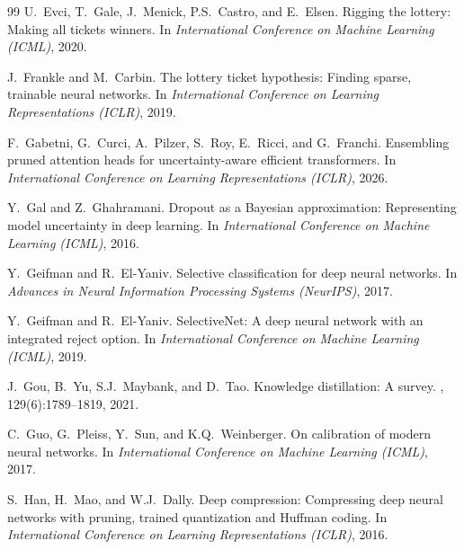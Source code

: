 \documentclass[letterpaper]{article} %
\begin{document}
\begin{thebibliography}{99}
U.~Evci, T.~Gale, J.~Menick, P.S.~Castro, and E.~Elsen.
\newblock Rigging the lottery: Making all tickets winners.
\newblock In {\em International Conference on Machine Learning (ICML)}, 2020.

J.~Frankle and M.~Carbin.
\newblock The lottery ticket hypothesis: Finding sparse, trainable neural networks.
\newblock In {\em International Conference on Learning Representations (ICLR)}, 2019.

F.~Gabetni, G.~Curci, A.~Pilzer, S.~Roy, E.~Ricci, and G.~Franchi.
\newblock Ensembling pruned attention heads for uncertainty-aware efficient transformers.
\newblock In {\em International Conference on Learning Representations (ICLR)}, 2026.

Y.~Gal and Z.~Ghahramani.
\newblock Dropout as a Bayesian approximation: Representing model uncertainty in deep learning.
\newblock In {\em International Conference on Machine Learning (ICML)}, 2016.

Y.~Geifman and R.~El-Yaniv.
\newblock Selective classification for deep neural networks.
\newblock In {\em Advances in Neural Information Processing Systems (NeurIPS)}, 2017.

Y.~Geifman and R.~El-Yaniv.
\newblock SelectiveNet: A deep neural network with an integrated reject option.
\newblock In {\em International Conference on Machine Learning (ICML)}, 2019.

J.~Gou, B.~Yu, S.J.~Maybank, and D.~Tao.
\newblock Knowledge distillation: A survey.
, 129(6):1789--1819, 2021.

C.~Guo, G.~Pleiss, Y.~Sun, and K.Q.~Weinberger.
\newblock On calibration of modern neural networks.
\newblock In {\em International Conference on Machine Learning (ICML)}, 2017.

S.~Han, H.~Mao, and W.J.~Dally.
\newblock Deep compression: Compressing deep neural networks with pruning, trained quantization and Huffman coding.
\newblock In {\em International Conference on Learning Representations (ICLR)}, 2016.


\end{thebibliography}
\end{document}
